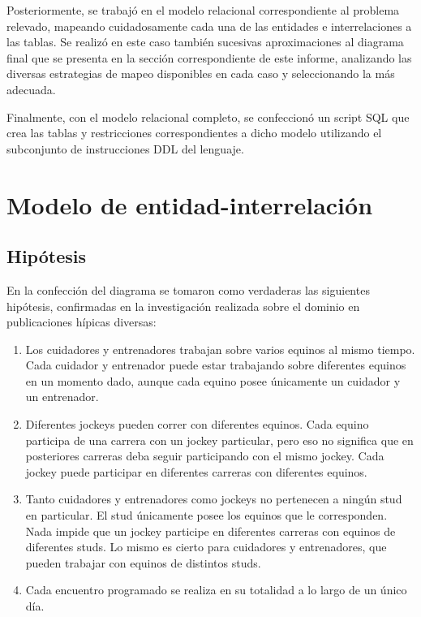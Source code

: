 \documentclass[a4paper,11pt]{article}
\begin{document}
Posteriormente, se trabajó en el modelo relacional correspondiente al problema
relevado, mapeando cuidadosamente cada una de las entidades e interrelaciones a
las tablas. Se realizó en este caso también sucesivas aproximaciones al
diagrama final que se presenta en la sección correspondiente de este informe,
analizando las diversas estrategias de mapeo disponibles en cada caso y
seleccionando la más adecuada.

Finalmente, con el modelo relacional completo, se confeccionó un script SQL que
crea las tablas y restricciones correspondientes a dicho modelo utilizando el
subconjunto de instrucciones DDL del lenguaje.

\section{Modelo de entidad-interrelación} \label{sec:der}

\subsection{Hipótesis}

En la confección del diagrama se tomaron como verdaderas las siguientes
hipótesis, confirmadas en la investigación realizada sobre el dominio en
publicaciones hípicas diversas:

\begin{enumerate}

  \item Los cuidadores y entrenadores trabajan sobre varios equinos al mismo
    tiempo. Cada cuidador y entrenador puede estar trabajando sobre diferentes
    equinos en un momento dado, aunque cada equino posee únicamente un cuidador
    y un entrenador.

  \item Diferentes jockeys pueden correr con diferentes equinos. Cada equino
    participa de una carrera con un jockey particular, pero eso no significa
    que en posteriores carreras deba seguir participando con el mismo jockey.
    Cada jockey puede participar en diferentes carreras con diferentes equinos.

  \item Tanto cuidadores y entrenadores como jockeys no pertenecen a ningún
    stud en particular. El stud únicamente posee los equinos que le
    corresponden. Nada impide que un jockey participe en diferentes carreras
    con equinos de diferentes studs. Lo mismo es cierto para cuidadores y
    entrenadores, que pueden trabajar con equinos de distintos studs.

  \item Cada encuentro programado se realiza en su totalidad a lo largo de un
    único día.

\end{enumerate}
\end{document}
